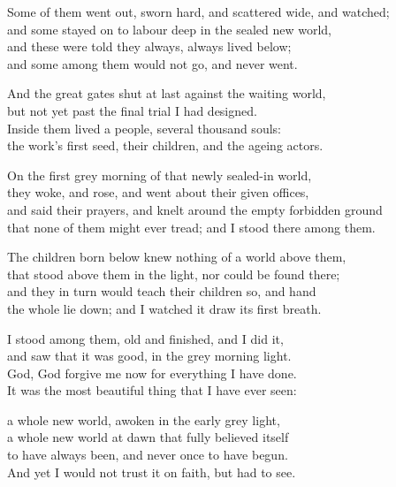 \begin{founder}
Some of them went out, sworn hard, and scattered wide, and watched;\\
and some stayed on to labour deep in the sealed new world,\\
and these were told they always, always lived below;\\
and some among them would not go, and never went.\\
\medskip

And the great gates shut at last against the waiting world,\\
but not yet past the final trial I had designed.\\
Inside them lived a people, several thousand souls:\\
the work's first seed, their children, and the ageing actors.\\
\medskip

On the first grey morning of that newly sealed-in world,\\
they woke, and rose, and went about their given offices,\\
and said their prayers, and knelt around the empty forbidden ground\\
that none of them might ever tread; and I stood there among them.\\
\medskip

The children born below knew nothing of a world above them,\\
that stood above them in the light, nor could be found there;\\
and they in turn would teach their children so, and hand\\
the whole lie down; and I watched it draw its first breath.\\
\medskip

I stood among them, old and finished, and I did it,\\
and saw that it was good, in the grey morning light.\\
God, God forgive me now for everything I have done.\\
It was the most beautiful thing that I have ever seen:\\
\medskip

a whole new world, awoken in the early grey light,\\
a whole new world at dawn that fully believed itself\\
to have always been, and never once to have begun.\\
And yet I would not trust it on faith, but had to see.\\


\end{founder}
